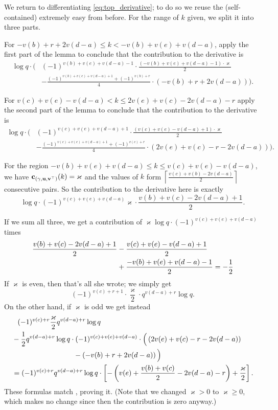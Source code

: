 We return to differentiating \eqref{eq:top_derivative};
to do so we reuse the (self-contained) extremely easy 
from before.
For the range of $k$ given, we split it into three parts.
\begin{itemize}
  \ii For $-v(b) + r + 2v(d-a) \le k < -v(b) + v(e) + v(d-a)$,
  apply the first part of the lemma to conclude that the contribution to the derivative is
  \begin{align*}
    \log q \cdot \Big( & (-1)^{v(b)+v(e)+v(d-a)-1} \cdot
      \frac{(-v(b)+v(e)+v(d-a)-1) \cdot \varkappa}{2} \\
      &
      - \frac{(-1)^{v(b)+v(e)+v(d-a)+1} + (-1)^{v(b)+r}}{4} \cdot (-v(b) + r + 2v(d-a))
    \Big).
  \end{align*}

  \ii For $v(c)+v(e)-v(d-a) < k \le 2v(e)+v(c)-2v(d-a)-r$
  apply the second part of the lemma to conclude that the contribution to the derivative is
  \begin{align*}
    \log q \cdot \Big( & (-1)^{v(c)+v(e)+v(d-a)+1} \cdot
      \frac{(v(c)+v(e)-v(d-a)+1) \cdot \varkappa}{2} \\
      &
      - \frac{(-1)^{v(c)+v(e)+v(d-a)+1} + (-1)^{v(c)+r}}{4} \cdot (2v(e)+v(c)-r-2v(d-a))
    \Big).
  \end{align*}

  \ii For the region $-v(b)+v(e)+v(d-a) \le k \le v(c)+v(e)-v(d-a)$,
  we have $\mathbf c_{{(\gamma, \mathbf u, \mathbf v^\top)}}(k) = \varkappa$
  and the values of $k$ form $\left\lceil \frac{v(c)+v(b)-2v(d-a)}{2} \right\rceil$ consecutive pairs.
  So the contribution to the derivative here is exactly
  \[ \log q \cdot (-1)^{v(c)+v(e)+v(d-a)} \varkappa \cdot \frac{v(b)+v(c)-2v(d-a)+1}{2}. \]
\end{itemize}
If we sum all three,
we get a contribution of $\varkappa \log q \cdot  (-1)^{v(c)+v(e)+v(d-a)}$ times
\begin{align*}
  \frac{v(b)+v(c)-2v(d-a)+1}{2} &- \frac{v(c)+v(e)-v(d-a)+1}{2} \\
  &+ \frac{-v(b)+v(e)+v(d-a)-1}{2} = -\frac{1}{2}
\end{align*}
If $\varkappa$ is even, then that's all she wrote; we simply get
\[ (-1)^{v(c)+r+1} \cdot \frac{\varkappa}{2} \cdot q^{v(d-a)+r} \log q. \]
On the other hand, if $\varkappa$ is odd we get instead
\begin{align*}
  &\phantom+ (-1)^{v(c)+r} \frac{\varkappa}{2} q^{v(d-a)+r} \log q \\
  &- \half q^{v(d-a)+r} \log q \cdot (-1)^{v(c)+v(e)+v(d-a)} \cdot
    \Big( \left( 2v(e)+v(c)-r-2v(d-a)\right) \\
    &\hspace{20ex} - \left( -v(b)+r+2v(d-a) \right) \Big) \\
  &= (-1)^{v(c)+r} q^{v(d-a)+r} \log q \cdot \left[
    -\left( v(e)+\frac{v(b)+v(c)}{2}-2v(d-a)-r \right) + \frac{\varkappa}{2} \right].
\end{align*}
These formulas match , proving it.
(Note that we changed $\varkappa > 0$ to $\varkappa \ge 0$,
which makes no change since then the contribution is zero anyway.)

